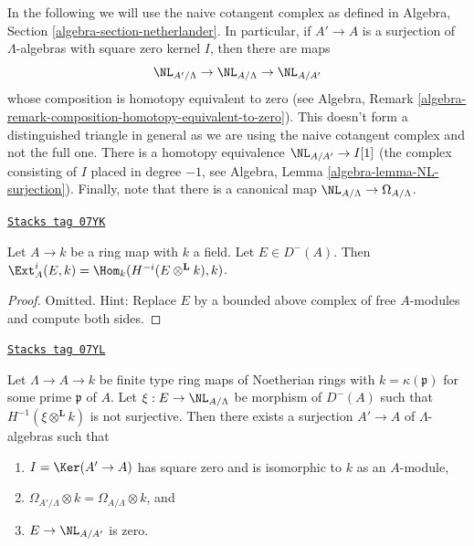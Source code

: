 \medskip\noindent
In the following we will use the naive cotangent complex as
defined in Algebra, Section \ref{algebra-section-netherlander}.
In particular, if $A' \to A$ is a surjection of $\Lambda$-algebras
with square zero kernel $I$, then there are maps
$$
\NL_{A'/\Lambda} \to \NL_{A/\Lambda} \to \NL_{A/A'}
$$
whose composition is homotopy equivalent to zero (see
Algebra, Remark \ref{algebra-remark-composition-homotopy-equivalent-to-zero}).
This doesn't form a distinguished triangle in general as we are using
the naive cotangent complex and not the full one.
There is a homotopy equivalence $\NL_{A/A'} \to I[1]$ (the complex
consisting of $I$ placed in degree $-1$, see
Algebra, Lemma \ref{algebra-lemma-NL-surjection}).
Finally, note that there is a canonical map
$\NL_{A/\Lambda} \to \Omega_{A/\Lambda}$.

\begin{lemma}
\label{artin-lemma-compute-ext-into-field}
\href{https://stacks.math.columbia.edu/tag/07YK}{\texttt{Stacks tag 07YK}}

Let $A \to k$ be a ring map with $k$ a field. Let $E \in D^-(A)$.
Then $\Ext^i_A(E, k) = \Hom_k(H^{-i}(E \otimes^\mathbf{L} k), k)$.
\end{lemma}

\begin{proof}
Omitted. Hint: Replace $E$ by a bounded above complex of free $A$-modules
and compute both sides.
\end{proof}

\begin{lemma}
\label{artin-lemma-construct-essential-surjection}
\href{https://stacks.math.columbia.edu/tag/07YL}{\texttt{Stacks tag 07YL}}

Let $\Lambda \to A \to k$ be finite type ring maps of Noetherian rings with
$k = \kappa(\mathfrak p)$ for some prime $\mathfrak p$ of $A$. Let
$\xi : E \to \NL_{A/\Lambda}$ be morphism of $D^{-}(A)$ such that
$H^{-1}(\xi \otimes^{\mathbf{L}} k)$ is not surjective.
Then there exists a surjection $A' \to A$ of $\Lambda$-algebras
such that
\begin{enumerate}
\item[(a)] $I = \Ker(A' \to A)$ has square zero and is isomorphic to $k$
as an $A$-module,
\item[(b)] $\Omega_{A'/\Lambda} \otimes k = \Omega_{A/\Lambda} \otimes k$, and
\item[(c)] $E \to \NL_{A/A'}$ is zero.
\end{enumerate}
\end{lemma}

